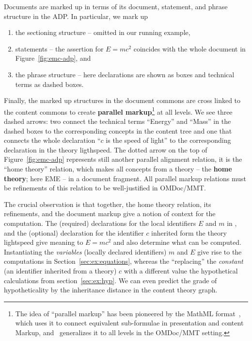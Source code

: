 Documents are marked up in terms of its document, statement, and phrase structure in the
ADP. In particular, we mark up
\begin{enumerate}
\item the sectioning structure -- omitted in our running example,
\item statements -- the assertion for $E=mc^2$ coincides with the whole document
   in Figure~\ref{fig:emc-adp}, and
\item the phrase structure -- here declarations are shown as boxes and technical terms as
  dashed boxes.
\end{enumerate}
Finally, the marked up structures in the document commons are cross linked to the content
commons to create \textbf{parallel markup}\footnote{The idea of ``parallel markup'' has
  been pioneered by the MathML format~\cite{CarlisleEd:MathML3:base}, which uses it to
  connect equivalent sub-formulae in presentation and content Markup, and~\cite{Iancu:phd}
  generalizes it to all levels in the OMDoc/MMT setting.} at all levels. We see three
dashed arrows: two connect the technical terms ``Energy'' and ``Mass'' in the dashed boxes
to the corresponding concepts in the content tree and one that connects the whole
declaration ``$c$ is the speed of light'' to the corresponding declaration in the theory
\textsf{ligthspeed}. The dotted arrow on the top of Figure~\ref{fig:emc-adp} represents
still another parallel alignment relation, it is the ``home theory'' relation, which makes
all concepts from a theory -- the \textbf{home theory}; here \textsf{EME} -- in a document
fragment. All parallel markup relations must be refinements of this relation to be
well-justified in OMDoc/MMT.

The crucial observation is that together, the home theory relation, its refinements, and
the document markup give a notion of context for the computation. The (required)
declarations for the local identifiers $E$ and $m$ in , and the
(optional) declaration for the identifier $c$ inherited form the theory
\textsf{lightspeed} give meaning to $E=mc^2$ and also determine what can be
computed. Instantiating the \emph{variables} (locally declared identifiers) $m$ and $E$
give rise to the computations in Section~\ref{sec:ex:equations}, whereas the ``replacing''
the \emph{constant} (an identifier inherited from a theory) $c$ with a different value the
hypothetical calculations from section~\ref{sec:ex:hyp}. We can even predict the grade of
hypotheticality by the inheritance distance in the content theory graph.

